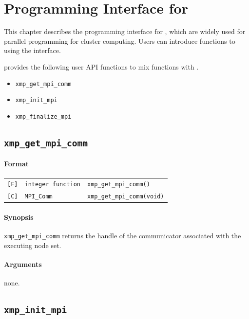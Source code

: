 \chapter{Programming Interface for {\MPI}}

   This chapter describes the programming interface for {\MPI},
   which are widely used for parallel programming for cluster computing.
   Users can introduce {\MPI} functions to {\XMP} using the interface.   

   {\XMP} provides the following user API functions to mix {\MPI}
   functions with {\XMP}.

\begin{itemize}
\item {\tt xmp\_get\_mpi\_comm}
\item {\tt xmp\_init\_mpi}
\item {\tt xmp\_finalize\_mpi}
\end{itemize}

\section{\tt xmp\_get\_mpi\_comm}

\subsubsection*{Format}

\begin{tabular}{lll}
\verb![F]!&  {\tt integer function}& {\tt xmp\_get\_mpi\_comm()}\\
\verb![C]!&  {\tt MPI\_Comm}& {\tt xmp\_get\_mpi\_comm(void)}
\end{tabular}

\subsubsection*{Synopsis}

   {\tt xmp\_get\_mpi\_comm} returns the handle of the communicator
   associated with the executing node set. 

\subsubsection*{Arguments}

none.

\section{\tt xmp\_init\_mpi}

